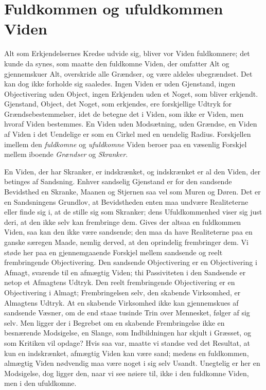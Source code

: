 \documentclass[12pt]{book}
\newcommand{\apage}[1]{\marginnote{\footnotesize\textit{[#1]}}}
\begin{document}
\apage{60} \section{Fuldkommen og ufuldkommen Viden}
\label{sec:7}

\noindent Alt som Erkjendelsernes Kredse udvide sig, bliver vor Viden
fuldkomnere; det kunde da synes, som maatte den fuldkomne Viden, der
omfatter Alt og gjennemskuer Alt, overskride alle Grændser, og være
aldeles ubegrændset. Det kan dog ikke forholde sig saaledes. Ingen Viden
er uden Gjenstand, ingen Objectivering uden Object, ingen Erkjenden uden
et Noget, som bliver erkjendt. Gjenstand, Object, det Noget, som
erkjendes, ere forskjellige Udtryk for Grændsebestemmelser, idet de
betegne det i Viden, som ikke er Viden, men hvoraf Viden bestemmes. En
Viden uden Modsætning, uden Grændse, en Viden af Viden i det Uendelige er
som en Cirkel med en uendelig Radius. Forskjellen imellem den \emph{fuldkomne} og
\emph{ufuldkomne} Viden beroer paa en væsenlig Forskjel mellem iboende \emph{Grændser}
og \emph{Skranker}.

En Viden, der har Skranker, er indskrænket, og indskrænket er al den
Viden, der betinges af Sandsning. Enhver sandselig Gjenstand er for den
sandsende Bevidsthed en Skranke, Maanen og Stjernen saa vel som Muren og
Døren. Det er en Sandsningens Grundlov, at Bevidstheden enten maa undvære
Realiteterne eller finde sig i, at de stille sig som Skranker; dens
Ufuldkommenhed viser sig just deri, at den ikke selv kan frembringe dem.
Gives der altsaa en fuldkommen Viden, saa kan den ikke være sandsende; den
maa da have Realiteterne paa en ganske særegen Maade, nemlig derved, at den
oprindelig frembringer \apage{61} dem. Vi støde her paa en gjennemgaaende Forskjel
mellem sandsende og reelt frembringende Objectivering. Den sandsende
Objectivering er en Objectivering i Afmagt, svarende til en afmægtig
Viden; thi Passiviteten i den Sandsende er netop et Afmagtens Udtryk. Den
reelt frembringende Objectivering er en Objectivering i Almagt;
Frembringelsen selv, den skabende Virksomhed, er Almagtens Udtryk. At en
skabende Virksomhed ikke kan gjennemskues af sandsende Væsner, om de end
staae tusinde Trin over Mennesket, følger af sig selv. Men ligger der i
Begrebet om en skabende Frembringelse ikke en besnærende Modsigelse, en
Slange, som Indbildningen har skjult i Græsset, og som Kritiken vil
opdage? Hvis saa var, maatte vi standse ved det Resultat, at kun en
indskrænket, afmægtig Viden kan være sand; medens en fuldkommen, almægtig
Viden nødvendig maa være noget i sig selv Usandt. Unegtelig er her en
Modsigelse, dog ligger den, naar vi see nøiere til, ikke i den fuldkomne
Viden, men i den ufuldkomne.
\end{document}
